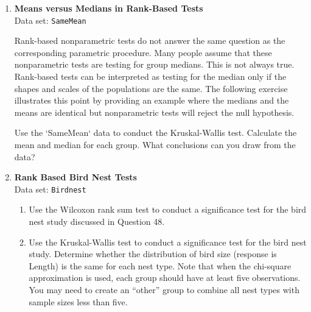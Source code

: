 \documentclass[
]{report}
\begin{document}
\begin{enumerate}
\begin{enumerate}
    \item Using a t-test, compute the two-sided $\scriptstyle p$-value for the bird nest study in Question 48. and compare the results to what you found with the randomization test.
    \item Using a t-test, compute the one-sided $\scriptstyle p$-value for the music study in Question 20 and compare the
results to what you found with the randomization test.
  \end{enumerate}
  
  
  
  
  \item \textbf{Means versus Medians in Rank-Based Tests} \\
  Data set: \texttt{SameMean}
  
  Rank-based nonparametric tests do not answer the same question as the corresponding parametric procedure. Many people assume that these nonparametric tests are testing for group medians. This is not always true. Rank-based tests can be interpreted as testing for the median only if the shapes and scales of the populations are the same. The following exercise illustrates this point by providing an example where the medians and the means are identical but nonparametric tests will reject the null hypothesis.

Use the `SameMean` data to conduct the Kruskal-Wallis test. Calculate the mean and median for each group. What conclusions can you draw from the data?
  
  
  
  
  \item \textbf{Rank Based Bird Nest Tests} \\
  Data set: \texttt{Birdnest}
  \begin{enumerate}
      
    \item Use the Wilcoxon rank sum test to conduct a significance test for the bird nest study discussed in
Question 48.
    \item Use the Kruskal-Wallis test to conduct a significance test for the bird nest study. Determine whether the distribution of bird size (response is Length) is the same for each nest type. Note that when the chi-square approximation is used, each group should have at least five observations. You may need to create an “other” group to combine all nest types with sample sizes less
than five.
  \end{enumerate}
  
  
  

\end{enumerate}
\end{document}
